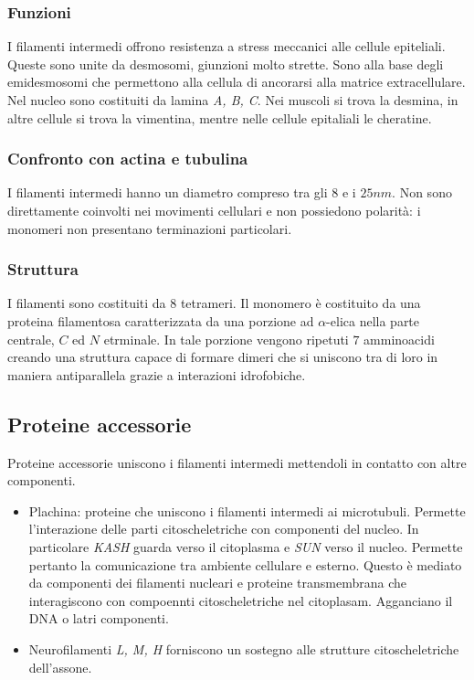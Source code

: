 		\subsubsection{Funzioni}
		I filamenti intermedi offrono resistenza a stress meccanici alle cellule epiteliali.
		Queste sono unite da desmosomi, giunzioni molto strette.
		Sono alla base degli emidesmosomi che permettono alla cellula di ancorarsi alla matrice extracellulare.
		Nel nucleo sono costituiti da lamina \emph{A, B, C}.
		Nei muscoli si trova la desmina, in altre cellule si trova la vimentina, mentre nelle cellule epitaliali le cheratine.

		\subsubsection{Confronto con actina e tubulina}
		I filamenti intermedi hanno un diametro compreso tra gli $8$ e i $25nm$.
		Non sono direttamente coinvolti nei movimenti cellulari e non possiedono polarit\`a: i monomeri non presentano terminazioni particolari.

		\subsubsection{Struttura}
		I filamenti sono costituiti da $8$ tetrameri.
		Il monomero \`e costituito da una proteina filamentosa caratterizzata da una porzione ad $\alpha$-elica nella parte centrale, $C$ ed $N$ etrminale.
		In tale porzione vengono ripetuti $7$ amminoacidi creando una struttura capace di formare dimeri che si uniscono tra di loro in maniera antiparallela grazie a interazioni idrofobiche.

	\subsection{Proteine accessorie}
	Proteine accessorie uniscono i filamenti intermedi mettendoli in contatto con altre componenti.
	\begin{multicols}{2}
		\begin{itemize}
			\item Plachina: proteine che uniscono i filamenti intermedi ai microtubuli.
				Permette l'interazione delle parti citoscheletriche con componenti del nucleo.
				In particolare \emph{KASH} guarda verso il citoplasma e \emph{SUN} verso il nucleo.
				Permette pertanto la comunicazione tra ambiente cellulare e esterno.
				Questo \`e mediato da componenti dei filamenti nucleari e proteine transmembrana che interagiscono con compoennti citoscheletriche nel citoplasam.
				Agganciano il DNA o latri componenti.
			\item Neurofilamenti \emph{L, M, H} forniscono un sostegno alle strutture citoscheletriche dell'assone.
		\end{itemize}
	\end{multicols}

